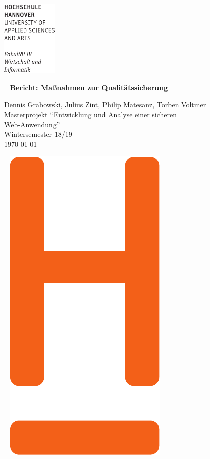 \documentclass[12pt,DIV14,BCOR10mm,a4paper,parskip=half-,headsepline,headinclude,english,ngerman,bibliography=totocnumbered]{scrreprt}
\begin{document}
  \thispagestyle{empty} %
\includegraphics[width=0.2\textwidth]{Wortmarke_WI_schwarz}

   {  ~ \sffamily
  \vfill
  {\Huge\bfseries Bericht: Maßnahmen zur Qualitätssicher\-ung}
  \bigskip

  {\Large
  Dennis Grabowski, Julius Zint, Philip Matesanz, Torben Voltmer \\[2ex]
  Masterprojekt \enquote{Entwicklung und Analyse einer sicheren \\Web-Anwendung} \\
  Wintersemester 18/19
 \\[5ex]
   \today }
}
 \vfill

  ~ \hfill
  \includegraphics[height=0.3\paperheight]{H_WI_Pantone1665}
\end{document}
